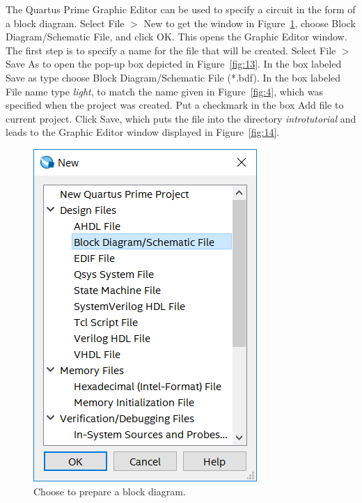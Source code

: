 \documentclass[11pt, twoside, pdftex]{article}
\begin{document}
The Quartus Prime Graphic Editor can be used to specify a circuit in the form of a
block diagram.
Select {\sf File $>$ New} to get the window in Figure~\ref{fig:12}, 
choose {\sf Block Diagram/Schematic File}, and click {\sf OK}. 
This opens the Graphic Editor window. 
The first step is to specify a name
for the file that will be created. Select {\sf File $>$ Save As}
to open the pop-up box depicted in Figure~\ref{fig:13}. 
In the box labeled {\sf Save as type} choose {\sf Block Diagram/Schematic File (*.bdf)}.
In the box labeled {\sf File name} type {\it light}, to match the name given
in Figure~\ref{fig:4}, which was specified when the project was created.
Put a checkmark in the box {\sf Add file to current project}.
Click {\sf Save}, which puts the file into the directory
{\it introtutorial} and leads to the Graphic Editor window displayed in Figure~\ref{fig:14}.
 
\begin{figure}[H]
   \begin{center}
      \includegraphics[scale=0.5]{figures/figure12.png}
   \caption{Choose to prepare a block diagram.} 
	 \label{fig:12}
	 \end{center}
\end{figure}
\end{document}

